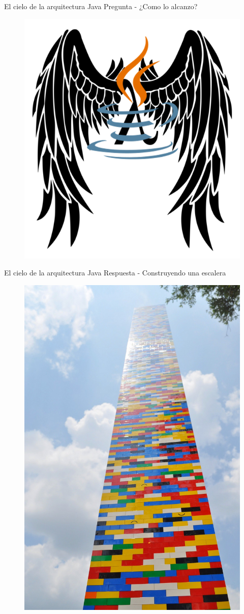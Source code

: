\documentclass{beamer}
\begin{document}
\begin{frame}{El cielo de la arquitectura Java}
\huge Pregunta - ¿Como lo alcanzo?
\begin{figure}
	\centering
	\includegraphics[width=0.6\linewidth]{Images/angel}
\end{figure}
\end{frame}

\begin{frame}{El cielo de la arquitectura Java}
\huge Respuesta - Construyendo una escalera
\begin{figure}
\centering
\includegraphics[width=0.6\linewidth]{Images/starwaytoheaven}
\end{figure}
\end{frame}
\end{document}
